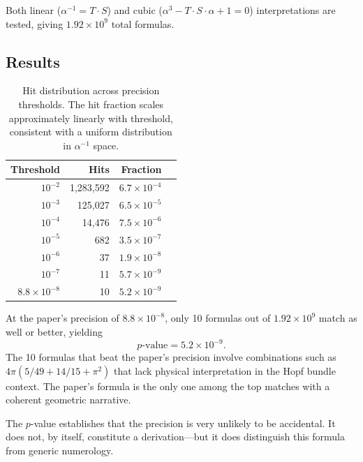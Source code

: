 \documentclass[aps,prl,twocolumn,superscriptaddress]{revtex4-2}
\begin{document}
Both linear ($\alpha^{-1} = T \cdot S$) and cubic
($\alpha^3 - T \cdot S \cdot \alpha + 1 = 0$) interpretations are
tested, giving $1.92 \times 10^9$ total formulas.

\subsection{Results}

\begin{table}[h]
\centering
\begin{tabular}{rrrr}
\hline\hline
Threshold & Hits & Fraction \\
\hline
$10^{-2}$          & 1{,}283{,}592  & $6.7 \times 10^{-4}$ \\
$10^{-3}$          &   125{,}027    & $6.5 \times 10^{-5}$ \\
$10^{-4}$          &    14{,}476    & $7.5 \times 10^{-6}$ \\
$10^{-5}$          &       682      & $3.5 \times 10^{-7}$ \\
$10^{-6}$          &        37      & $1.9 \times 10^{-8}$ \\
$10^{-7}$          &        11      & $5.7 \times 10^{-9}$ \\
$8.8\times 10^{-8}$ &       10      & $5.2 \times 10^{-9}$ \\
\hline\hline
\end{tabular}
\caption{Hit distribution across precision thresholds. The hit
fraction scales approximately linearly with threshold, consistent with
a uniform distribution in $\alpha^{-1}$ space.}
\label{tab:hits}
\end{table}

At the paper's precision of $8.8 \times 10^{-8}$, only 10 formulas
out of $1.92 \times 10^9$ match as well or better, yielding
\begin{equation}
  \boxed{p\text{-value} = 5.2 \times 10^{-9}.}
\end{equation}
The 10 formulas that beat the paper's precision involve combinations
such as $4\pi(5/49 + 14/15 + \pi^2)$ that lack physical
interpretation in the Hopf bundle context. The paper's formula is the
only one among the top matches with a coherent geometric narrative.

The $p$-value establishes that the precision is very unlikely to be
accidental. It does not, by itself, constitute a derivation---but it
does distinguish this formula from generic numerology.


\end{document}

